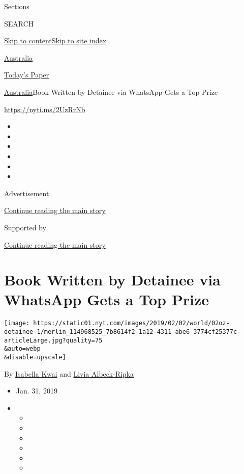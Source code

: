 Sections

SEARCH

\protect\hyperlink{site-content}{Skip to
content}\protect\hyperlink{site-index}{Skip to site index}

\href{https://www.nytimes.com/section/world/australia}{Australia}

\href{https://myaccount.nytimes.com/auth/login?response_type=cookie\&client_id=vi}{}

\href{https://www.nytimes.com/section/todayspaper}{Today's Paper}

\href{/section/world/australia}{Australia}\textbar{}Book Written by
Detainee via WhatsApp Gets a Top Prize

\url{https://nyti.ms/2UzRrNb}

\begin{itemize}
\item
\item
\item
\item
\item
\item
\end{itemize}

Advertisement

\protect\hyperlink{after-top}{Continue reading the main story}

Supported by

\protect\hyperlink{after-sponsor}{Continue reading the main story}

\hypertarget{book-written-by-detainee-via-whatsapp-gets-a-top-prize}{%
\section{Book Written by Detainee via WhatsApp Gets a Top
Prize}\label{book-written-by-detainee-via-whatsapp-gets-a-top-prize}}

\texttt{[image: https://static01.nyt.com/images/2019/02/02/world/02oz-detainee-1/merlin\_114968525\_7b8614f2-1a12-4311-abe6-3774cf25377c-articleLarge.jpg?quality=75\\\&auto=webp\\\&disable=upscale]}

By \href{https://www.nytimes.com/by/isabella-kwai}{Isabella Kwai} and
\href{https://www.nytimes.com/by/livia-albeck-ripka}{Livia Albeck-Ripka}

\begin{itemize}
\item
  Jan. 31, 2019
\item
  \begin{itemize}
  \item
  \item
  \item
  \item
  \item
  \item
  \end{itemize}
\end{itemize}

